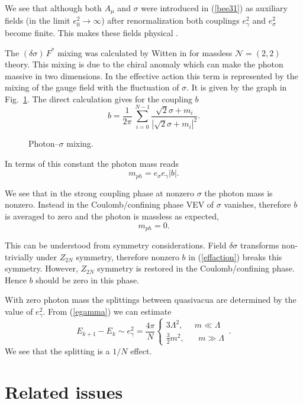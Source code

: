 \documentclass[epsfig,12pt]{article}
\def\beq{\begin{equation}}
\def\eeq{\end{equation}}
\def\beq{\begin{equation}}
\def\eeq{\end{equation}}
\newcommand{\ntwot}{${\mathcal N}= \left(2,2\right) $ }
\begin{document}
{We see that although both $A_{\mu}$ and $\sigma$ were introduced in (\ref{bee31})
as auxiliary fields (in the limit $e^2_0\to\infty$) after renormalization both 
couplings $e^2_{\gamma}$ and  $e^2_{\sigma}$ become finite. This makes these
fields physical \cite{W79}.


The $(\delta \sigma)\, F^{*}$ mixing was calculated by Witten in \cite{W79}
for massless \ntwot theory. This mixing  is due to
the chiral anomaly which can make the photon massive in two dimensions. In the effective action
this term is represented by the mixing of the gauge field with the fluctuation of 
$\sigma$. It is given by the graph in Fig.~\ref{fig:photsig}. The direct calculation gives
for the coupling $b$ 
\beq
b= \frac{1}{2\pi}\,\sum_{i=0}^{N-1}\frac{\sqrt{2}\sigma+m_i}{|\sqrt{2}\sigma+m_i|^2}.
\label{gamma}
\eeq

\begin{figure}
\epsfxsize=6cm
\centerline{}
\caption{\small
Photon--$\sigma$ mixing. }
\label{fig:photsig}
\end{figure}


In terms of this constant the photon mass reads
\beq
m_{ph}=  e_{\sigma}e_{\gamma}|b|.
\label{phmass}
\eeq

We see that in the strong coupling phase at nonzero $\sigma$ the photon mass is nonzero.
Instead in the Coulomb/confining phase VEV of $\sigma$ vanishes, therefore $b$ 
is averaged to zero and 
the photon is massless as expected,
\beq
m_{ph}=0.
\eeq

This can be understood from symmetry considerations. Field $\delta \sigma$ transforms
non-trivially under $Z_{2N}$ symmetry, therefore nonzero $b$ in (\ref{effaction})
breaks this symmetry. However, $Z_{2N}$ symmetry is restored in the Coulomb/confining phase.
Hence $b$ should be zero in this phase.

With zero photon mass the splittings between quasivacua are determined by the value of
$e_{\gamma}^2$. From (\ref{egamma}) we can estimate
\beq
E_{k+1}-E_{k}\sim e^2_{\gamma}
=\frac{4\pi}{N}\left\{
\begin{array}{cc}
3\Lambda^2,\;\;\;\;\; m\ll \Lambda\\[2mm]
\frac32 m^2,\;\;\;\;\;\; m\gg \Lambda
\end{array}\,.
\right.
\label{split}
\eeq
We see that the splitting is a $1/N$ effect.



\newpage

\section{Related issues}
\label{relais}
\setcounter{equation}{0}

}
\end{document}
